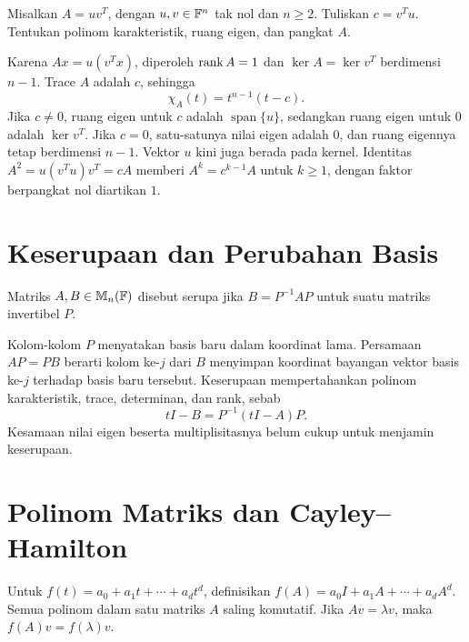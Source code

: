 \begin{exam}
    Misalkan $A=uv^T$, dengan $u,v\in\mathbb{F}^n$ tak nol dan $n\ge2$.
    Tuliskan $c=v^Tu$. Tentukan polinom karakteristik, ruang eigen,
    dan pangkat $A$.
\end{exam}
\begin{solution}
    Karena $Ax=u(v^Tx)$, diperoleh $\operatorname{rank} A=1$ dan
    $\ker A=\ker v^T$ berdimensi $n-1$.
    Trace $A$ adalah $c$, sehingga
    \[
        \chi_A(t)=t^{n-1}(t-c).
    \]
    Jika $c\ne0$, ruang eigen untuk $c$ adalah $\operatorname{span}\{u\}$,
    sedangkan ruang eigen untuk $0$ adalah $\ker v^T$.
    Jika $c=0$, satu-satunya nilai eigen adalah $0$, dan ruang eigennya
    tetap berdimensi $n-1$. Vektor $u$ kini juga berada pada kernel.
    Identitas $A^2=u(v^Tu)v^T=cA$ memberi
    $A^k=c^{k-1}A$ untuk $k\ge1$, dengan faktor berpangkat nol diartikan $1$.
\end{solution}

\section{Keserupaan dan Perubahan Basis}
\label{eigen:similaritas}

\begin{definisi}
    Matriks $A,B\in\mathbb{M}_n(\mathbb{F})$ disebut serupa jika
    $B=P^{-1}AP$ untuk suatu matriks invertibel $P$.
\end{definisi}

Kolom-kolom $P$ menyatakan basis baru dalam koordinat lama.
Persamaan $AP=PB$ berarti kolom ke-$j$ dari $B$ menyimpan koordinat
bayangan vektor basis ke-$j$ terhadap basis baru tersebut.
Keserupaan mempertahankan polinom karakteristik, trace, determinan,
dan rank, sebab
\[
    tI-B=P^{-1}(tI-A)P.
\]
Kesamaan nilai eigen beserta multiplisitasnya belum cukup untuk
menjamin keserupaan.

\section{Polinom Matriks dan Cayley--Hamilton}
\label{eigen:polinom}

Untuk $f(t)=a_0+a_1t+\cdots+a_dt^d$, definisikan
$f(A)=a_0I+a_1A+\cdots+a_dA^d$.
Semua polinom dalam satu matriks $A$ saling komutatif.
Jika $Av=\lambda v$, maka $f(A)v=f(\lambda)v$.

